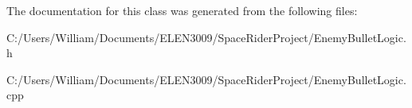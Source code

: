 The documentation for this class was generated from the following files\+:\begin{DoxyCompactItemize}
\item 
C\+:/\+Users/\+William/\+Documents/\+E\+L\+E\+N3009/\+Space\+Rider\+Project/Enemy\+Bullet\+Logic.\+h\item 
C\+:/\+Users/\+William/\+Documents/\+E\+L\+E\+N3009/\+Space\+Rider\+Project/Enemy\+Bullet\+Logic.\+cpp\end{DoxyCompactItemize}

